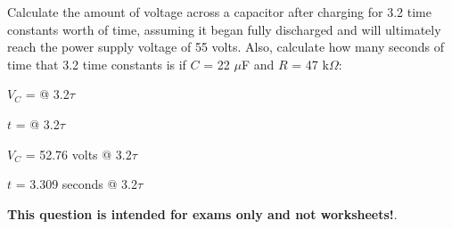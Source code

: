 

Calculate the amount of voltage across a capacitor after charging for 3.2 time constants worth of time, assuming it began fully discharged and will ultimately reach the power supply voltage of 55 volts.  Also, calculate how many seconds of time that 3.2 time constants is if $C$ = 22 $\mu$F and $R$ = 47 k$\Omega$:

\vskip 10pt

$V_C$ = \underbar{\hskip 50pt} @ 3.2$\tau$

\vskip 10pt

$t$ = \underbar{\hskip 50pt} @ 3.2$\tau$







$V_C$ = 52.76 volts @ 3.2$\tau$

\vskip 10pt

$t$ = 3.309 seconds @ 3.2$\tau$







{\bf This question is intended for exams only and not worksheets!}.



